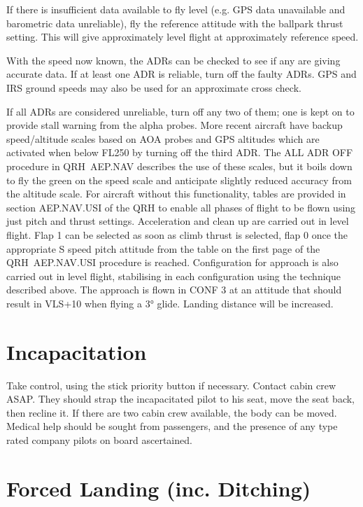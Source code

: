 \documentclass[a5paper,11pt,twoside]{book}
\newcommand{\multicite}[1]{
  \nopagebreak
  \noindent{\footnotesize\color{blue}{[ #1 ]}}
}
\begin{document}
If there is insufficient data available to fly level (e.g. GPS data unavailable
and barometric data unreliable), fly the reference attitude with the ballpark
thrust setting. This will give approximately level flight at approximately
reference speed.

With the speed now known, the ADRs can be checked to see if any are giving
accurate data. If at least one ADR is reliable, turn off the faulty ADRs. GPS
and IRS ground speeds may also be used for an approximate cross check.

If all ADRs are considered unreliable, turn off any two of them; one is kept on
to provide stall warning from the alpha probes. More recent aircraft have backup
speed/altitude scales based on AOA probes and GPS altitudes which are activated
when below FL250 by turning off the third ADR. The ALL ADR OFF procedure in
QRH AEP.NAV describes the use of these scales, but it boils down to fly the
green on the speed scale and anticipate slightly reduced accuracy from the
altitude scale.  For aircraft without this functionality, tables are provided in
section AEP.NAV.USI of the QRH to enable all phases of flight to be flown using
just pitch and thrust settings. Acceleration and clean up are carried out in
level flight. Flap 1 can be selected as soon as climb thrust is selected, flap 0
once the appropriate S speed pitch attitude from the table on the first page of
the QRH AEP.NAV.USI procedure is reached. Configuration for approach is also
carried out in level flight, stabilising in each configuration using the
technique described above. The approach is flown in CONF 3 at an attitude that
should result in VLS+10 when flying a 3° glide. Landing distance will be
increased.

\multicite{QRH AEP.NAV, FCOM PRO.AEP.NAV, FCTM PRO.AEP.NAV}

\section{Incapacitation}

Take control, using the stick priority button if necessary. Contact cabin crew ASAP. They
should strap the incapacitated pilot to his seat, move the seat back, then recline it. If there
are two cabin crew available, the body can be moved. Medical help should be sought from
passengers, and the presence of any type rated company pilots on board ascertained.

\multicite{FCTM PRO.AEP.MISC}

\section{Forced Landing (inc. Ditching)}
\end{document}
